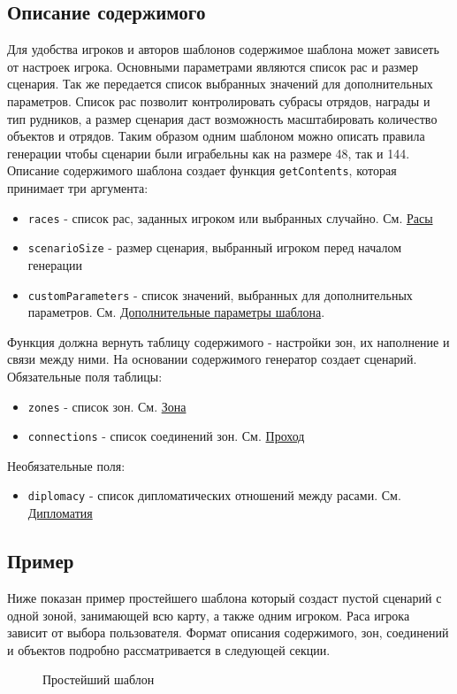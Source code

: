 \subsection{Описание содержимого}
\label{contentsTable}
Для удобства игроков и авторов шаблонов содержимое шаблона может зависеть от настроек игрока. Основными параметрами являются список рас и размер сценария.
Так же передается список выбранных значений для дополнительных параметров.
Список рас позволит контролировать субрасы отрядов, награды и тип рудников, а размер сценария даст возможность масштабировать количество объектов и отрядов.
Таким образом одним шаблоном можно описать правила генерации чтобы сценарии были играбельны как на размере 48, так и 144.\\
Описание содержимого шаблона создает функция \texttt{getContents}, которая принимает три аргумента:
\begin{itemize}
\item \texttt{races} - список рас, заданных игроком или выбранных случайно. См. \hyperref[raceTypes]{Расы}
\item \texttt{scenarioSize} - размер сценария, выбранный игроком перед началом генерации
\item \texttt{customParameters} - список значений, выбранных для дополнительных параметров. См. \hyperref[customParameters]{Дополнительные параметры шаблона}.
\end{itemize}
Функция должна вернуть таблицу содержимого - настройки зон, их наполнение и связи между ними. На основании содержимого генератор создает сценарий.\\
Обязательные поля таблицы:
\begin{itemize}
\item \texttt{zones} - список зон. См. \hyperref[zone]{Зона}
\item \texttt{connections} - список соединений зон. См. \hyperref[connection]{Проход}
\end{itemize}
Необязательные поля:
\begin{itemize}
\item \texttt{diplomacy} - список дипломатических отношений между расами. См. \hyperref[diplomacy]{Дипломатия}
\end{itemize}

\subsection{Пример}
Ниже показан пример простейшего шаблона который создаст пустой сценарий с одной зоной, занимающей всю карту, а также одним игроком. Раса игрока зависит от выбора пользователя.
Формат описания содержимого, зон, соединений и объектов подробно рассматривается в следующей секции.
\begin{figure}[H]

\caption{Простейший шаблон}
\end{figure}